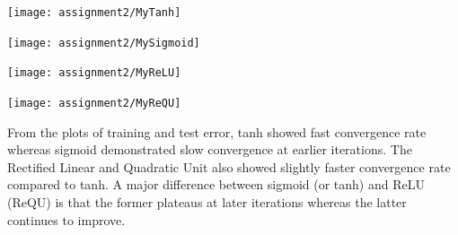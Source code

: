 \documentclass[twoside,12pt]{article}
\begin{document}
\texttt{[image: assignment2/MyTanh]}

\texttt{[image: assignment2/MySigmoid]}

\texttt{[image: assignment2/MyReLU]}

\texttt{[image: assignment2/MyReQU]}


From the plots of training and test error, tanh showed fast convergence rate whereas sigmoid demonstrated
slow convergence at earlier iterations. The Rectified Linear and Quadratic Unit also showed slightly faster
convergence rate compared to tanh. A major difference between sigmoid (or tanh) and ReLU (ReQU) is that
the former plateaus at later iterations whereas the latter continues to improve.
\end{document}
